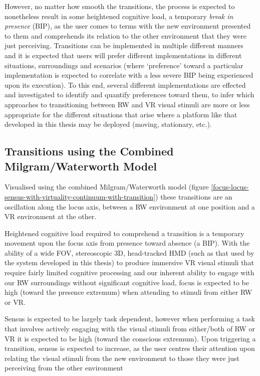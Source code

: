 However, no matter how smooth the transitions, the process is expected to nonetheless result in some heightened cognitive load, a temporary \textit{break in presence}\breakinpresencefootnote{} (BIP), as the user comes to terms with the new environment presented to them and comprehends its relation to the other environment that they were just perceiving. Transitions can be implemented in multiple different manners and it is expected that users will prefer different implementations in different situations, surroundings and scenarios (where `preference' toward a particular implementation is expected to correlate with a less severe BIP being experienced upon its execution). To this end, several different implementations are effected and investigated to identify and quantify preferences toward them, to infer which approaches to transitioning between RW and VR visual stimuli are more or less appropriate for the different situations that arise where a platform like that developed in this thesis may be deployed (moving, stationary, etc.).

\subsection{Transitions using the Combined Milgram/Waterworth Model}
Visualised using the combined Milgram/Waterworth model (figure \ref{focus-locus-sensus-with-virtuality-continuum-with-transition}) these transitions are an oscillation along the locus axis, between a RW environment at one position and a VR environment at the other.

Heightened cognitive load required to comprehend a transition is a temporary movement upon the focus axis from presence toward absence (a BIP). With the ability of a wide FOV, stereoscopic 3D, head-tracked HMD (such as that used by the system developed in this thesis) to produce immersive VR visual stimuli that require fairly limited cognitive processing and our inherent ability to engage with our RW surroundings without significant cognitive load, focus is expected to be high (toward the presence extremum) when attending to stimuli from either RW or VR.

Sensus is expected to be largely task dependent, however when performing a task that involves actively engaging with the visual stimuli from either/both of RW or VR it is expected to be high (toward the conscious extremum). Upon triggering a transition, sensus is expected to increase, as the user centres their attention upon relating the visual stimuli from the new environment to those they were just perceiving from the other environment

